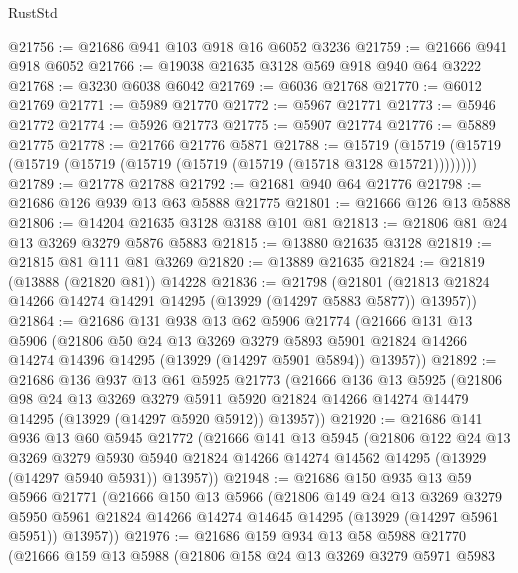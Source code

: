 \begin{lexlean}{RustStd}
\begin{coremodule}
@21756 := @21686 @941 @103 @918 @16 @6052 @3236
@21759 := @21666 @941 @918 @6052
@21766 := @19038 @21635 @3128 @569 @918 @940 @64 @3222
@21768 := @3230 @6038 @6042
@21769 := @6036 @21768
@21770 := @6012 @21769
@21771 := @5989 @21770
@21772 := @5967 @21771
@21773 := @5946 @21772
@21774 := @5926 @21773
@21775 := @5907 @21774
@21776 := @5889 @21775
@21778 := @21766 @21776 @5871
@21788 := @15719
    (@15719 (@15719 (@15719 (@15719 (@15719 (@15719 (@15719 (@15718 @3128 @15721))))))))
@21789 := @21778 @21788
@21792 := @21681 @940 @64 @21776
@21798 := @21686 @126 @939 @13 @63 @5888 @21775
@21801 := @21666 @126 @13 @5888
@21806 := @14204 @21635 @3128 @3188 @101 @81
@21813 := @21806 @81 @24 @13 @3269 @3279 @5876 @5883
@21815 := @13880 @21635 @3128
@21819 := @21815 @81 @111 @81 @3269
@21820 := @13889 @21635
@21824 := @21819 (@13888 (@21820 @81)) @14228
@21836 := @21798
    (@21801 (@21813 @21824 @14266 @14274 @14291 @14295 (@13929 (@14297 @5883 @5877)) @13957))
@21864 := @21686
    @131
    @938
    @13
    @62
    @5906
    @21774
    (@21666
      @131
      @13
      @5906
      (@21806
        @50
        @24
        @13
        @3269
        @3279
        @5893
        @5901
        @21824
        @14266
        @14274
        @14396
        @14295
        (@13929 (@14297 @5901 @5894))
        @13957))
@21892 := @21686
    @136
    @937
    @13
    @61
    @5925
    @21773
    (@21666
      @136
      @13
      @5925
      (@21806
        @98
        @24
        @13
        @3269
        @3279
        @5911
        @5920
        @21824
        @14266
        @14274
        @14479
        @14295
        (@13929 (@14297 @5920 @5912))
        @13957))
@21920 := @21686
    @141
    @936
    @13
    @60
    @5945
    @21772
    (@21666
      @141
      @13
      @5945
      (@21806
        @122
        @24
        @13
        @3269
        @3279
        @5930
        @5940
        @21824
        @14266
        @14274
        @14562
        @14295
        (@13929 (@14297 @5940 @5931))
        @13957))
@21948 := @21686
    @150
    @935
    @13
    @59
    @5966
    @21771
    (@21666
      @150
      @13
      @5966
      (@21806
        @149
        @24
        @13
        @3269
        @3279
        @5950
        @5961
        @21824
        @14266
        @14274
        @14645
        @14295
        (@13929 (@14297 @5961 @5951))
        @13957))
@21976 := @21686
    @159
    @934
    @13
    @58
    @5988
    @21770
    (@21666
      @159
      @13
      @5988
      (@21806
        @158
        @24
        @13
        @3269
        @3279
        @5971
        @5983

\end{coremodule}
\end{lexlean}

